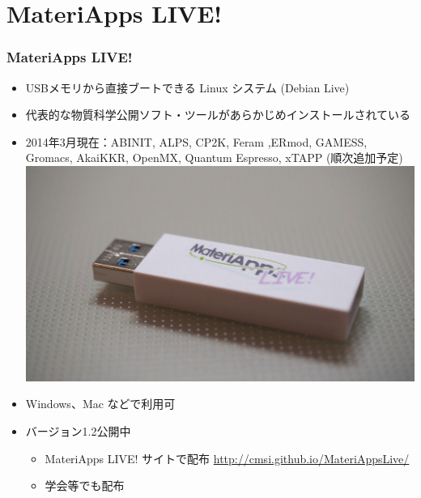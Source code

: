 \section{MateriApps LIVE!}

\begin{frame}
 \frametitle{MateriApps LIVE!}
 \begin{itemize}
   \item USBメモリから直接ブートできる Linux システム (Debian Live)
   \item 代表的な物質科学公開ソフト・ツールがあらかじめインストールされている
   \item 2014年3月現在：ABINIT, ALPS, CP2K, Feram ,ERmod, GAMESS, Gromacs, AkaiKKR, OpenMX, Quantum Espresso, xTAPP (順次追加予定)
     \hspace*{7cm}
     \includegraphics[width=0.3\linewidth,bb=0 0 4096 2268]{materiappslive.jpg}
     \vspace*{-1.0cm}
   \item Windows、Mac などで利用可
   \item バージョン1.2公開中
     \begin{itemize}
     \item MateriApps LIVE! サイトで配布 \url{http://cmsi.github.io/MateriAppsLive/}
     \item 学会等でも配布
     \end{itemize}
 \end{itemize}
\end{frame}


